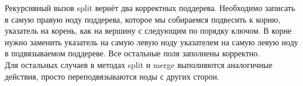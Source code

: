 \documentclass[12pt]{article}
\newenvironment{problem}[2][Задача]{\begin{trivlist}
\item[\hskip \labelsep {\bfseries #1}\hskip \labelsep {\bfseries #2.}]}{\end{trivlist}}
\begin{document}
\begin{problem}{4b}
    Рекурсивный вызов split вернёт два корректных поддерева. Необходимо записать 
    в самую правую ноду поддерева, которое мы собираемся подвесить к корню, 
    указатель на корень, как на вершину с следующим по порядку ключом. В корне
    нужно заменить указатель на самую левую ноду указателем на самую левую ноду в
    подвязываемом поддереве. Все остальные поля заполнены корректно.\\

    Для остальных случаев в методах split и merge выполняются аналогичные действия,
    просто переподвязываются ноды с других сторон.

\end{problem}

%
%    
%
%
%
%
%
%


 
\end{document}
